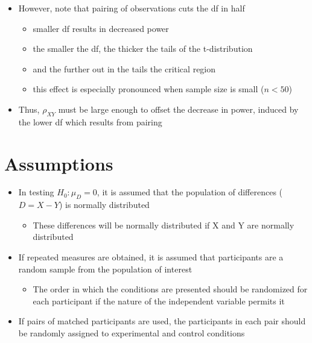 \documentclass[12pt]{article}
\begin{document}
\begin{itemize}
\itemsep1pt\parskip0pt
\item
  However, note that pairing of observations cuts the df in half

  \begin{itemize}
  \itemsep1pt\parskip0pt
  \item
    smaller df results in decreased power
  \item
    the smaller the df, the thicker the tails of the t-distribution
  \item
    and the further out in the tails the critical region
  \item
    this effect is especially pronounced when sample size is small
    (\(n < 50\))
  \end{itemize}
\item
  Thus, \(\rho_{XY}\) must be large enough to offset the decrease in
  power, induced by the lower df which results from pairing
\end{itemize}

\section{Assumptions}\label{assumptions}

\begin{itemize}
\itemsep1pt\parskip0pt
\item
  In testing \(H_{0}: \mu_{D} = 0\), it is assumed that the population
  of differences (\(D = X - Y\)) is normally distributed

  \begin{itemize}
  \itemsep1pt\parskip0pt
  \item
    These differences will be normally distributed if X and Y are
    normally distributed
  \end{itemize}
\item
  If repeated measures are obtained, it is assumed that participants are
  a random sample from the population of interest

  \begin{itemize}
  \itemsep1pt\parskip0pt
  \item
    The order in which the conditions are presented should be randomized
    for each participant if the nature of the independent variable
    permits it
  \end{itemize}
\item
  If pairs of matched participants are used, the participants in each
  pair should be randomly assigned to experimental and control
  conditions
\end{itemize}
\end{document}
